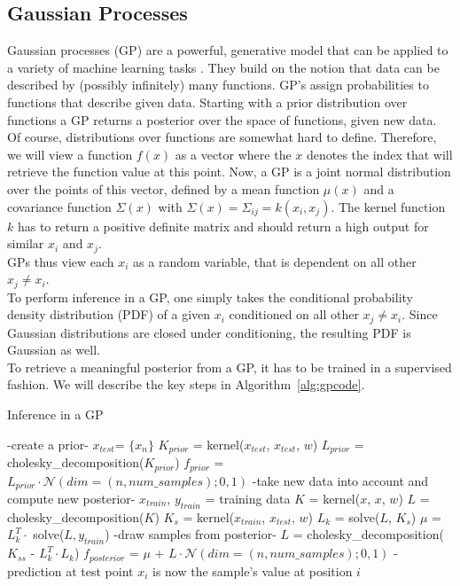 \documentclass[a4paper,cleardoubleempty,BCOR1cm, 11pt]{report}
\begin{document}
\subsection{Gaussian Processes}\label{sec:gp}
Gaussian processes (GP) are a powerful, generative model that can be applied to a variety of machine learning tasks \cite{mackay1998introduction}. They build on the notion that data can be described by (possibly infinitely) many functions. GP's assign probabilities to functions that describe given data. Starting with a prior distribution over functions a GP returns a posterior over the space of functions, given new data. Of course, distributions over functions are somewhat hard to define. Therefore, we will view a function $f(x)$ as a vector where the $x$ denotes the index that will retrieve the function value at this point. Now, a GP is a joint normal distribution over the points of this vector, defined by a mean function $\mu(x)$ and a covariance function $\Sigma(x)$ with $\Sigma(x) = \Sigma_{ij} = k(x_i,x_j)$. The kernel function $k$ has to return a positive definite matrix and should return a high output for similar $x_i$ and $x_j$.\\
GPs thus view each $x_i$ as a random variable, that is dependent on all other $x_j\neq x_i$.\\
To perform inference in a GP, one simply takes the conditional probability density distribution (PDF) of a given $x_i$ conditioned on all other $x_j\neq x_i$. Since Gaussian distributions are closed under conditioning, the resulting PDF is Gaussian as well.\\
To retrieve a meaningful posterior from a GP, it has to be trained in a supervised fashion. We will describe the key steps in Algorithm~\ref{alg:gpcode}.


\begin{algorithm}
	\caption{Inference in a GP}
	\label{alg:gpcode}
	\begin{algorithmic}
\STATE -create a prior-
\STATE $x_{test}$= $\lbrace x_n \rbrace$
\STATE $K_{prior}$ = kernel($x_{test}$, $x_{test}$, $w$)
\STATE $L_{prior}$ = cholesky\_decomposition($K_{prior}$)
\STATE $f_{prior}$ = $L_{prior} \cdot \mathcal{N}(dim=(n, num\_samples);0,1)$
\STATE
\STATE -take new data into account and compute new posterior-
\STATE $x_{train}$, $y_{train}$ = training data
\STATE $K$ = kernel($x$, $x$, $w$)
\STATE $L$ = cholesky\_decomposition($K$)
\STATE $K_s$ = kernel($x_{train}$, $x_{test}$, $w$)
\STATE $L_k$ = solve($L$, $K_s$)
\STATE $\mu$ = $L_k^T \cdot$ solve($L, y_{train}$)
\STATE
\STATE -draw samples from posterior-
\STATE $L$ = cholesky\_decomposition($K_{ss}$ - $L_k^T \cdot L_k$)
\STATE $f_{posterior}$ = $\mu$ + $L \cdot \mathcal{N}(dim=(n, num\_samples);0,1)$
\STATE - prediction at test point $x_i$ is now the sample's value at position $i$
	\end{algorithmic}
\end{algorithm}
\end{document}
